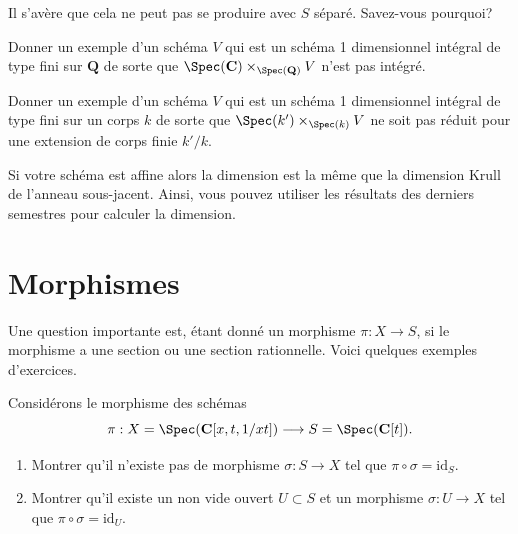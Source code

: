 \begin{remark}
\label{remark-separated-base-fibre-product-affines-affine}
Il s'avère que cela ne peut pas se produire avec $S$ séparé. Savez-vous pourquoi?
\end{remark}

\begin{exercise}
\label{exercise-not-geometrically-integral}
Donner un exemple d'un schéma
$V$ qui est un schéma 1 dimensionnel intégral de
type fini sur ${\mathbf Q}$
de sorte que $\Spec({\mathbf C}) \times_{\Spec({\mathbf Q})} V$
n'est pas intégré.
\end{exercise}

\begin{exercise}
\label{exercise-not-geometrically-reduced}
Donner un exemple d'un schéma
$V$ qui est un schéma 1 dimensionnel intégral de type fini
sur un corps $k$ de sorte que $\Spec(k') \times_{\Spec(k)} V$ ne
soit pas réduit pour une extension de corps finie $k'/k$.
\end{exercise}

\begin{remark}
\label{remark-affine-dimension}
Si votre schéma est affine alors la dimension est
la même que la dimension Krull de l'anneau sous-jacent. Ainsi, vous pouvez
utiliser les résultats des derniers semestres pour calculer la dimension.
\end{remark}






\section{Morphismes}
\label{section-morphisms}

\noindent
Une question importante est, étant donné un morphisme $\pi : X
\to S$, si le morphisme a une section ou une
section rationnelle. Voici quelques exemples d'exercices.

\begin{exercise}
\label{exercise-no-section}
Considérons le morphisme des schémas
$$
\pi :
X = \Spec(\mathbf{C}[x, t, 1/xt])
\longrightarrow
S = \Spec(\mathbf{C}[t]).
$$
\begin{enumerate}
\item Montrer qu'il n'existe pas de morphisme $\sigma : S \to
X$ tel que $\pi \circ \sigma = \text{id}_S$.
\item Montrer qu'il existe un non vide ouvert $U \subset S$ et
un morphisme $\sigma : U \to X$ tel que $\pi \circ \sigma = \text{id}_U$.
\end{enumerate}
\end{exercise}

